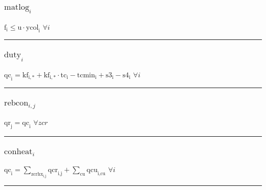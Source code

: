 \documentclass[11pt]{article}
\begin{document}
\subsubsection*{\begin{math}\text{matlog}_{i}\end{math}}
\begin{math}
\text{f}_{\text{i}} \leq \text{u} \cdot \text{ycol}_{\text{i}}
\end{math}
\hfill
\begin{math}
\forall i
\end{math}\vspace{5pt}
\hrule
\subsubsection*{\begin{math}\text{duty}_{i}\end{math}}
\begin{math}
\text{qc}_{\text{i}} = \text{kf}_{\text{i},*} + \text{kf}_{\text{i},*} \cdot \text{tc}_{\text{i}} - \text{tcmin}_{\text{i}} + \text{s3}_{\text{i}} - \text{s4}_{\text{i}}
\end{math}
\hfill
\begin{math}
\forall i
\end{math}\vspace{5pt}
\hrule
\subsubsection*{\begin{math}\text{rebcon}_{i,j}\end{math}}
\begin{math}
\text{qr}_{\text{j}} = \text{qc}_{\text{i}}
\end{math}
\hfill
\begin{math}
\forall zcr
\end{math}\vspace{5pt}
\hrule
\subsubsection*{\begin{math}\text{conheat}_{i}\end{math}}
\begin{math}
\text{qc}_{\text{i}} = \displaystyle \sum_{\text{zcrhx}_{\text{i},\text{j}}} \text{qcr}_{\text{i},\text{j}} + \displaystyle \sum_{\text{cu}} \text{qcu}_{\text{i},\text{cu}}
\end{math}
\hfill
\begin{math}
\forall i
\end{math}\vspace{5pt}
\hrule
\end{document}
